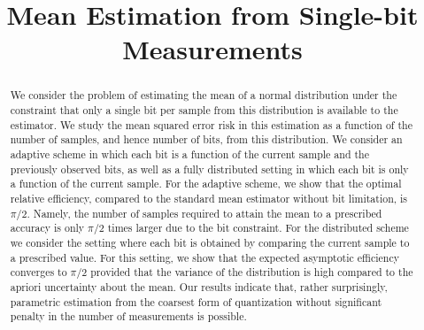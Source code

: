 \documentclass[letterpaper, conference]{IEEEtran}      %
\title{\LARGE \bf Mean Estimation from Single-bit Measurements}
\begin{document}
\graphicspath{{../Figures/}}
\maketitle
\thispagestyle{empty}
\pagestyle{empty}



\begin{abstract}
We consider the problem of estimating the mean of a normal distribution under the constraint that only a single bit per sample from this distribution is available to the estimator. We study the mean squared error risk in this estimation as a function of the number of samples, and hence number of bits, from this distribution. We consider an adaptive scheme in which each bit is a function of the current sample and the previously observed bits, as well as a fully distributed setting in which each bit is only a function of the current sample. For the adaptive scheme, we show that the optimal relative efficiency, compared to the standard mean estimator without bit limitation, is $\pi/2$. Namely, the number of samples required to attain the mean to a prescribed accuracy is only $\pi/2$ times larger due to the bit constraint. For the distributed scheme we consider the setting where each bit is obtained by comparing the current sample to a prescribed value. For this setting, we show that the expected asymptotic efficiency converges to $\pi/2$ provided that the variance of the distribution is high compared to the apriori uncertainty about the mean. Our results indicate that, rather surprisingly, parametric estimation from the coarsest form of quantization without significant penalty in the number of measurements is possible. 
\end{abstract}



\end{document}
